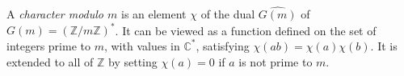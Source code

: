 A \emph{character modulo $m$} is an element $\chi$ of the dual $\widehat{G(m)}$ of $G(m) = (\mathbb{Z}/m\mathbb{Z})^*$. It can be viewed as a function defined on the set of integers prime to $m$, with values in $\mathbb{C}^*$, satisfying $\chi(ab) = \chi(a)\chi(b)$. It is extended to all of $\mathbb{Z}$ by setting $\chi(a) = 0$ if $a$ is not prime to $m$.
